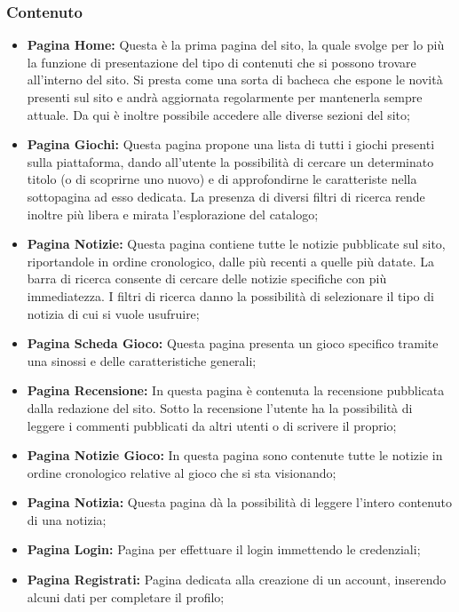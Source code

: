 \subsubsection{Contenuto}

\begin{itemize}
	\item \textbf{Pagina Home:} Questa è la prima pagina del sito, la quale svolge per lo più la funzione di presentazione del tipo di contenuti che si possono trovare all'interno del sito.
Si presta come una sorta di bacheca che espone le novità presenti sul sito e andrà aggiornata regolarmente per mantenerla sempre attuale. Da qui è inoltre possibile accedere alle diverse sezioni del sito;
	\item \textbf{Pagina Giochi:} Questa pagina propone una lista di tutti i giochi presenti sulla piattaforma, dando all'utente la possibilità di cercare un determinato titolo (o di scoprirne uno nuovo) e di approfondirne le caratteriste nella sottopagina ad esso dedicata. La presenza di diversi filtri di ricerca rende inoltre più libera e mirata l'esplorazione del catalogo;
	\item \textbf{Pagina Notizie:} Questa pagina contiene tutte le notizie pubblicate sul sito, riportandole in ordine cronologico, dalle più recenti a quelle più datate. La barra di ricerca consente di cercare delle notizie specifiche con più immediatezza. I filtri di ricerca danno la possibilità di selezionare il tipo di notizia di cui si vuole usufruire;
	\item \textbf{Pagina Scheda Gioco:} Questa pagina presenta un gioco specifico tramite una sinossi e delle caratteristiche generali;	
	\item \textbf{Pagina Recensione:} In questa pagina è contenuta la recensione pubblicata dalla redazione del sito. Sotto la recensione l'utente ha la possibilità di leggere i commenti pubblicati da altri utenti o di scrivere il proprio;
	\item \textbf{Pagina Notizie Gioco:} In questa pagina sono contenute tutte le notizie in ordine cronologico relative al gioco che si sta visionando;
	\item \textbf{Pagina Notizia:} Questa pagina dà la possibilità di leggere l'intero contenuto di una notizia;
	\item \textbf{Pagina Login:} Pagina per effettuare il login immettendo le credenziali;
	\item \textbf{Pagina Registrati:} Pagina dedicata alla creazione di un account, inserendo alcuni dati per completare il profilo;

\end{itemize}
